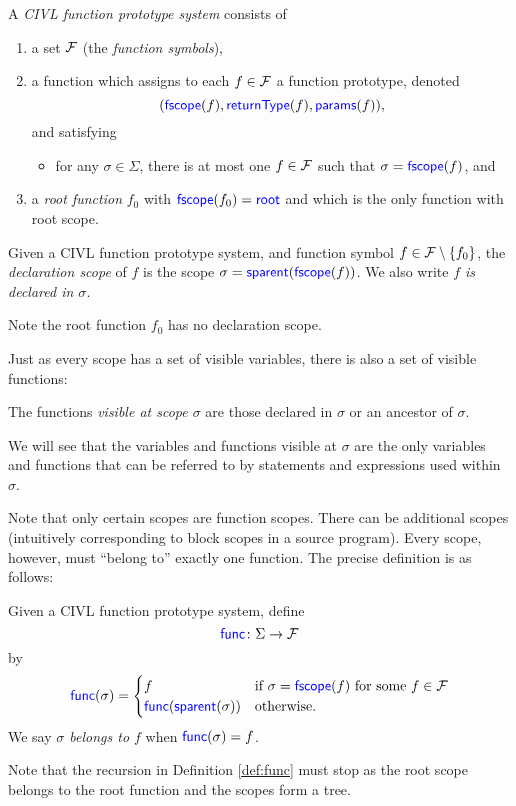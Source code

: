 \documentclass[11pt, oneside, letterpaper]{book}
\begin{document}
\begin{definition}
  A \emph{CIVL function prototype system} consists of
  \begin{enumerate}
  \item a set $\mathcal{F}$ (the \emph{function symbols}),
  \item a function which assigns to each $f\in\mathcal{F}$ a 
    function prototype, denoted
    \[
    (\textsf{\textcolor{blue}{\textup{fscope}}}(f), \textsf{\textcolor{blue}{\textup{returnType}}}(f), \textsf{\textcolor{blue}{\textup{params}}}(f)),
    \]
    and satisfying
    \begin{itemize}
    \item for any $\sigma\in\Sigma$, there is at most
      one $f\in\mathcal{F}$ such that $\sigma=\textsf{\textcolor{blue}{\textup{fscope}}}(f)$, and
    \end{itemize}
  \item a \emph{root function} $f_0$ with $\textsf{\textcolor{blue}{\textup{fscope}}}(f_0)=\textsf{\textcolor{blue}{\textup{root}}}$
    and which is the only function with root scope.
  \end{enumerate}
\end{definition}


\begin{definition}
  Given a CIVL function prototype system, and function symbol
  $f\in\mathcal{F}\setminus\{f_0\}$, the \emph{declaration scope} of $f$ is
  the scope $\sigma=\textsf{\textcolor{blue}{\textup{sparent}}}(\textsf{\textcolor{blue}{\textup{fscope}}}(f))$.  We also write \emph{$f$ is
    declared in $\sigma$.}
\end{definition}

Note the root function $f_0$ has no declaration scope.

Just as every scope has a set of visible variables, there is also
a set of visible functions:
\begin{definition} 
  The functions \emph{visible at scope $\sigma$} are
  those declared in $\sigma$ or an ancestor of $\sigma$.
\end{definition}
We will see that the variables and functions visible at $\sigma$ are
the only variables and functions that can be referred to by statements
and expressions used within $\sigma$.

Note that only certain scopes are function scopes.  There can be
additional scopes (intuitively corresponding to block scopes in a
source program).  Every scope, however, must ``belong to'' exactly one
function.  The precise definition is as follows:
\begin{definition}
  \label{def:func}
  Given a CIVL function prototype system, define
  \[
  \textsf{\textcolor{blue}{\textup{func}}} \colon \Sigma \rightarrow \mathcal{F} 
  \]
  by
  \[
  \textsf{\textcolor{blue}{\textup{func}}}(\sigma)=
  \begin{cases}
    f & \text{if $\sigma=\textsf{\textcolor{blue}{\textup{fscope}}}(f)$ for some $f\in\mathcal{F}$}\\
    \textsf{\textcolor{blue}{\textup{func}}}(\textsf{\textcolor{blue}{\textup{sparent}}}(\sigma)) & \text{otherwise.}
  \end{cases}
  \]
  We say \emph{$\sigma$ belongs to $f$}  when $\textsf{\textcolor{blue}{\textup{func}}}(\sigma)=f$.
\end{definition}
Note that the recursion in Definition \ref{def:func} must stop as the
root scope belongs to the root function and the scopes form a tree.
\end{document}
